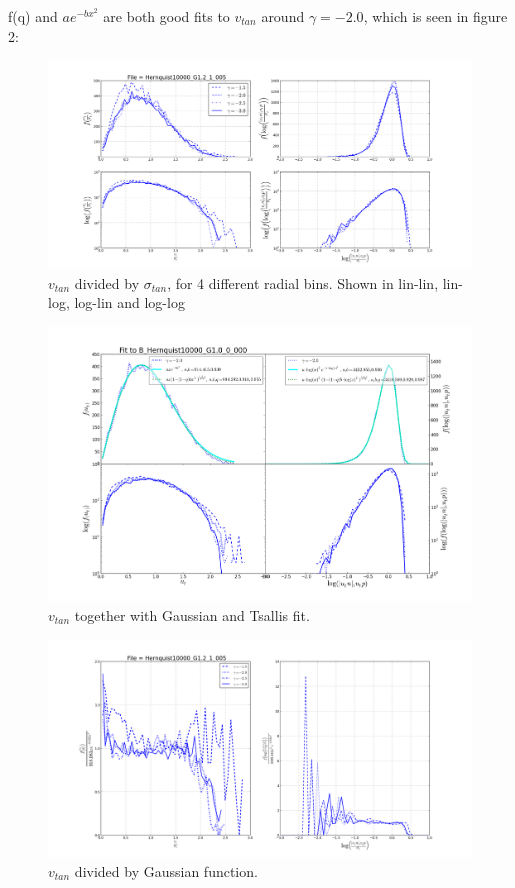 f(q) and $ae^{-bx^2}$ are both good fits to $v_{tan}$ around $\gamma = -2.0$, which is seen in figure 2:

\begin{figure}
\centering
\includegraphics[width=1.0\linewidth]{img/2.png}
\caption{$v_{tan}$ divided by $\sigma_{tan}$, for 4 different radial bins. Shown in lin-lin, lin-log, log-lin and log-log}
\label{fig:test}
\end{figure}

\begin{figure}
\centering
\includegraphics[width=1.0\linewidth]{img/vt_fit_show_abq.png}
\caption{$v_{tan}$ together with Gaussian and Tsallis fit.}
\label{fig:test}
\end{figure}

\begin{figure}
\centering
\includegraphics[width=1.0\linewidth]{img/func_guess_vt.png}
\caption{$v_{tan}$ divided by Gaussian function.}
\label{fig:test}
\end{figure}

